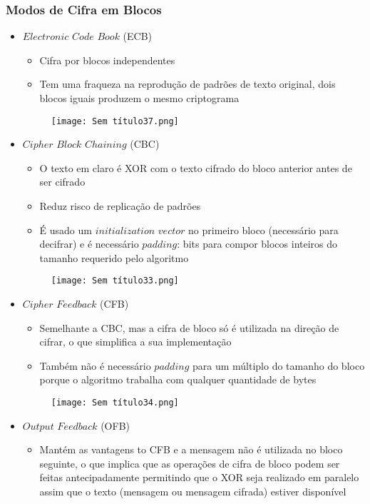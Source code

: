 \documentclass[10pt,a4paper]{report}
\begin{document}
\subsubsection{Modos de Cifra em Blocos}
\begin{itemize}
\item $Electronic$ $Code$ $Book$ (ECB)
\begin{itemize}
\item Cifra por blocos independentes
\item Tem uma fraqueza na reprodução de padrões de texto original, dois blocos iguais produzem o mesmo criptograma
\end{itemize}
\begin{figure}[H]
\centering
\texttt{[image: Sem título37.png]}
\end{figure}
\item $Cipher$ $Block$ $Chaining$ (CBC)
\begin{itemize}
\item O texto em claro é XOR com o texto cifrado do bloco anterior antes de ser cifrado
\item Reduz risco de replicação de padrões
\item É usado um $initialization$ $vector$ no primeiro bloco (necessário para decifrar) e é necessário $padding$:  bits para compor blocos inteiros do tamanho requerido pelo algoritmo
\end{itemize}
\begin{figure}[H]
\centering
\texttt{[image: Sem título33.png]}
\end{figure}
\item $Cipher$ $Feedback$ (CFB)
\begin{itemize}
\item Semelhante a CBC, mas a cifra de bloco só é utilizada na direção de cifrar, o que simplifica a sua implementação
\item Também não é necessário $padding$ para um múltiplo do tamanho do bloco porque o algoritmo trabalha com qualquer quantidade de bytes
\end{itemize}
\begin{figure}[H]
\centering
\texttt{[image: Sem título34.png]}
\end{figure}
\item $Output$ $Feedback$ (OFB)
\begin{itemize}
\item Mantém as vantagens to CFB e a mensagem não é utilizada no bloco seguinte, o que implica que as operações de cifra de bloco podem ser feitas antecipadamente permitindo que o XOR seja realizado em paralelo assim que o texto (mensagem ou mensagem cifrada) estiver disponível

\end{itemize}
\end{itemize}
\end{document}
